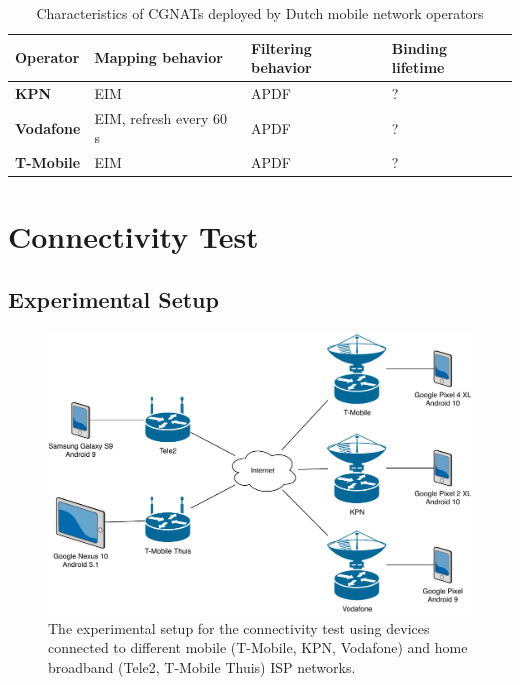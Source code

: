 

\begin{table}[h!]
    \centering
    \begin{tabular}{ | l | l | l | l | }
        \hline
        \textbf{Operator} & \textbf{Mapping behavior} & \textbf{Filtering behavior} & \textbf{Binding lifetime} \\
        \hline
        \textbf{KPN} & EIM & APDF & ? \\
        \textbf{Vodafone} & EIM, refresh every 60 s & APDF & ? \\
        \textbf{T-Mobile} & EIM & APDF & ? \\
        \hline
    \end{tabular}
    \caption{Characteristics of CGNATs deployed by Dutch mobile network operators}
    \label{table_cgnat_analysis}
\end{table}




\section{Connectivity Test}

\subsection{Experimental Setup}


\begin{figure}[h!]
    \includegraphics[width=\textwidth]{diagrams/experimental-setup}
    \caption{The experimental setup for the connectivity test using devices connected to different mobile (T-Mobile, KPN, Vodafone) and home broadband (Tele2, T-Mobile Thuis) ISP networks.}
    \label{ble_architecture}
\end{figure}


